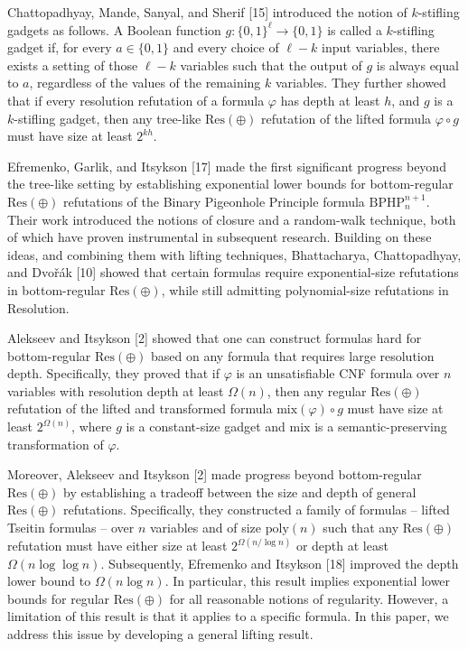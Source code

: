 Chattopadhyay, Mande, Sanyal, and Sherif [15] introduced the notion of
$k$-stifling gadgets as follows.
A Boolean function $g:\{0,1\}^{\ell}\to\{0,1\}$ is called a $k$-stifling gadget
if, for every $a\in\{0,1\}$ and every choice of $\ell-k$ input variables,
there exists a setting of those $\ell-k$ variables such that the output of $g$
is always equal to $a$, regardless of the values of the remaining $k$ variables.
They further showed that if every resolution refutation of a formula $\varphi$ has
depth at least $h$, and $g$ is a $k$-stifling gadget, then any tree-like $\mathrm{Res}(\oplus)$
refutation of the lifted formula $\varphi\circ g$ must have size at least $2^{kh}$.\par



Efremenko, Garlik, and Itsykson [17] made the first significant progress beyond
the tree-like setting by establishing exponential lower bounds for bottom-regular
$\mathrm{Res}(\oplus)$ refutations of the Binary Pigeonhole Principle formula $\mathrm{BPHP}^{n+1}_{n}$.
Their work introduced the notions of closure and a random-walk technique, both of
which have proven instrumental in subsequent research.
Building on these ideas, and combining them with lifting techniques, Bhattacharya, Chattopadhyay,
and Dvořák [10] showed that certain formulas require exponential-size refutations in
bottom-regular $\mathrm{Res}(\oplus)$, while still admitting polynomial-size refutations in
Resolution.\par



Alekseev and Itsykson [2] showed that one can construct formulas hard for bottom-regular
$\mathrm{Res}(\oplus)$ based on any formula that requires large resolution depth.
Specifically, they proved that if $\varphi$ is an unsatisfiable CNF formula over $n$ variables
with resolution depth at least $\Omega(n)$, then any regular $\mathrm{Res}(\oplus)$ refutation of the
lifted and transformed formula $\mathrm{mix}(\varphi)\circ g$ must have size at least $2^{\Omega(n)}$,
where $g$ is a constant-size gadget and $\mathrm{mix}$ is a semantic-preserving transformation of $\varphi$.\par



Moreover, Alekseev and Itsykson [2] made progress beyond bottom-regular $\mathrm{Res}(\oplus)$ by
establishing a tradeoff between the size and depth of general $\mathrm{Res}(\oplus)$ refutations.
Specifically, they constructed a family of formulas – lifted Tseitin formulas – over $n$ variables and of size $\mathrm{poly}(n)$
such that any $\mathrm{Res}(\oplus)$ refutation must have either size at least $2^{\Omega(n/\log n)}$ or
depth at least $\Omega(n\log\log n)$.
Subsequently, Efremenko and Itsykson [18] improved the depth lower bound to $\Omega(n\log n)$.
In particular, this result implies exponential lower bounds for regular $\mathrm{Res}(\oplus)$ for all
reasonable notions of regularity.
However, a limitation of this result is that it applies to a specific formula.
In this paper, we address this issue by developing a general lifting result.\par



